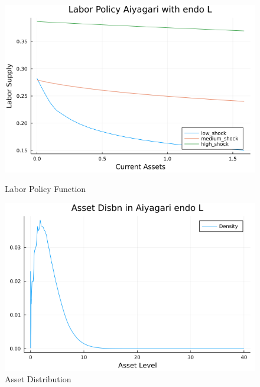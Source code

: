 \documentclass[12pt]{article}
\begin{document}
\begin{figure}[h]
    \centering
    \begin{minipage}{0.45\textwidth}
        \centering
        \includegraphics[width=1\textwidth]{endoL_L_p.png} %
        \caption{Labor Policy Function}
    \end{minipage}\hfill
    \begin{minipage}{0.45\textwidth}
        \centering
        \includegraphics[width=1\textwidth]{endoL_A_dis.png} %
        \caption{Asset Distribution}
    \end{minipage}
\end{figure}
\end{document}
